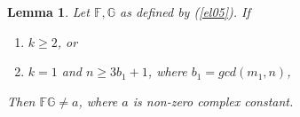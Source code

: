 \documentclass[a4paper,draft]{amsproc}
\theoremstyle{plain}
\newtheorem{lem}{Lemma}[section]
\theoremstyle{definition}
\theoremstyle{remark}
\renewcommand{\d}{\displaystyle}
\numberwithin{equation}{section}
\renewcommand{\leq}{\leqslant}\renewcommand{\geq}{\geqslant}
\begin{document}
\begin{lem}\label{l04}
Let $\mathbb{F}, \mathbb{G}$ as defined by (\ref{el05}). If
\begin{enumerate}
\item[(a)] $k\geq2$, or
\item[(b)] $k=1$ and $n\geq 3b_1+1$, where $b_1=gcd(m_1,n)$,
\end{enumerate} 
Then $\mathbb{F}\mathbb{G} \not= a$, where $a$ is non-zero complex constant.\end{lem}
\end{document}

